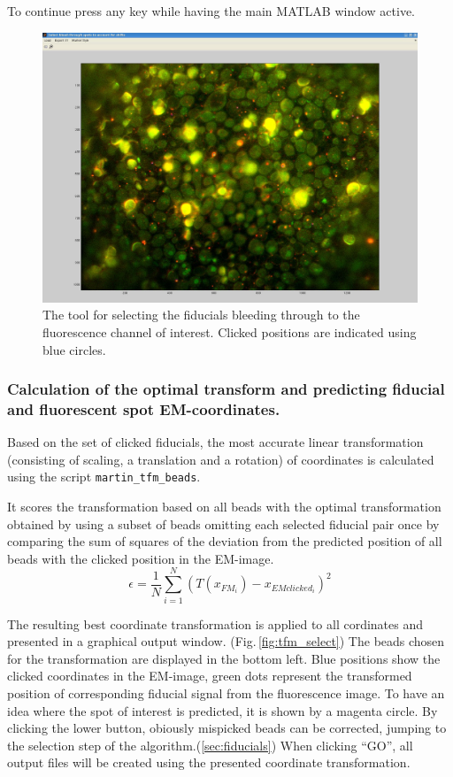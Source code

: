 \documentclass[10pt,a4paper,onepage,DIV12]{scrartcl}
\begin{document}
To continue press any key while having the main MATLAB window active.\\

\begin{figure}
 \centering
 \includegraphics[width=.78\textwidth]{images/digitize.jpg}
 \caption{The tool for selecting the fiducials bleeding through to the fluorescence channel of interest. Clicked positions are indicated using blue circles.}
 \label{fig:digitize}
\end{figure}

\subsubsection{Calculation of the optimal transform and predicting fiducial and fluorescent spot EM-coordinates.}
Based on the set of clicked fiducials, the most accurate linear transformation (consisting of scaling, a translation and a rotation) of coordinates is calculated using the script \texttt{martin\_tfm\_beads}.


It scores the transformation based on all beads with the optimal transformation obtained by using a subset of beads omitting each selected fiducial pair once by comparing the sum of squares of the deviation from the predicted position of all beads with the clicked position in the EM-image.
$$
\epsilon = \frac{1}{N}\sum_{i=1}^N (T({x_{FM_i}})-x_{EMclicked_i})^2
$$


The resulting best coordinate transformation is applied to all cordinates and presented in a graphical output window. (Fig.\,\ref{fig:tfm_select}) The beads chosen for the transformation are displayed in the bottom left. Blue positions show the clicked coordinates in the EM-image, green dots represent the transformed position of corresponding fiducial signal from the fluorescence image. To have an idea where the spot of interest is predicted, it is shown by a magenta circle. By clicking the lower button, obiously mispicked beads can be corrected, jumping to the selection step of the algorithm.(\ref{sec:fiducials}) When clicking ``GO'', all output files will be created using the presented coordinate transformation.\\
\end{document}
